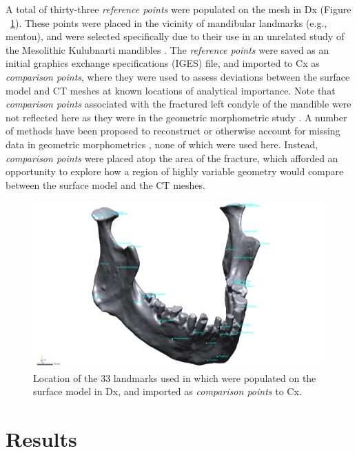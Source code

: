 \documentclass[review]{elsarticle}
\begin{document}
A total of thirty-three \textit{reference points} were populated on the mesh in Dx (Figure ~\ref{fig:Fig4}). These points were placed in the vicinity of mandibular landmarks (e.g., menton), and were selected specifically due to their use in an unrelated study of the Mesolithic Kulubnarti mandibles \citep{RN11477}. The \textit{reference points} were saved as an initial graphics exchange specifications (IGES) file, and imported to Cx as \textit{comparison points}, where they were used to assess deviations between the surface model and CT meshes at known locations of analytical importance. Note that \textit{comparison points} associated with the fractured left condyle of the mandible were not reflected here as they were in the geometric morphometric study \citep{RN11477}. A number of methods have been proposed to reconstruct \citep{RN11496,RN11501} or otherwise account for missing data in geometric morphometrics \citep{RN11500,RN11497,RN11498,RN11499,RN5928}, none of which were used here. Instead, \textit{comparison points} were placed atop the area of the fracture, which afforded an opportunity to explore how a region of highly variable geometry would compare between the surface model and the CT meshes.

\begin{figure}[ht]\centering
\includegraphics[width=\linewidth]{Fig4}
\caption{Location of the 33 landmarks used in \citet[Supplementary Information]{RN11477} which were populated on the surface model in Dx, and imported as \textit{comparison points} to Cx.}
\label{fig:Fig4}
\end{figure}

\section{Results}
\end{document}
